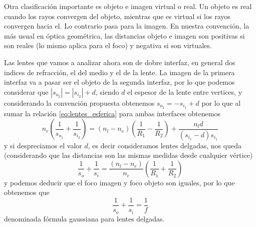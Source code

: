\documentclass[a4paper]{article}
\numberwithin{equation}{section}
\begin{document}
		Otra clasificación importante es objeto e imagen virtual o real. Un objeto es real cuando los rayos convergen del objeto, mientras que es virtual si los rayos convergen hacia el. Lo contrario pasa para la imagen. En nuestra convención, la más usual en óptica geométrica, las distancias objeto e imagen son positivas si son reales (lo mismo aplica para el foco) y negativa si son virtuales.
		
		Las lentes que vamos a analizar ahora son de dobre interfaz, en general dos indices de refracción, el del medio y el de la lente. La imagen de la primera interfaz va a pasar ser el objeto de la segunda interfaz, por lo que podemos considerar que $|s_{o_2}| = |s_{i_2}| + d$, siendo $d$ el espesor de la lente entre vertices, y considerando la convención propuesta obtenemos $s_{o_2} = - s_{i_1} + d$ por lo que al sumar la relación \ref{eq:lentes_esferica} para ambas interfaces obtenemos
		\begin{equation}
			n_{e} \left(\frac{1}{s_{o_1}} + \frac{1}{s_{i_2}}\right) = (n_l - n_e)\left(\frac{1}{R_1} - \frac{1}{R_2}\right) + \frac{n_l d}{(s_{i_1} - d) s_{i_1}}
			\label{eq:lentes_general}
		\end{equation}
		y si despreciamos el valor $d$, es decir consideramos lentes delgadas, nos queda (considerando que las distancias son las mismas medidas desde cualquier vértice)
		\begin{equation}
			\frac{1}{s_o} + \frac{1}{s_i} = \frac{(n_l - n_e)}{n_e} \left(\frac{1}{R_1} + \frac{1}{R_2}\right)
			\label{eq:lentes_constructores}
		\end{equation}
		y podemos deducir que el foco imagen y foco objeto son iguales, por lo que obtenemos que
		\begin{equation}
			\frac{1}{s_o} + \frac{1}{s_i} = \frac{1}{f}
			\label{eq:lentes_guassiana}
		\end{equation}
		denominada fórmula gaussiana para lentes delgadas.
		
\end{document}
